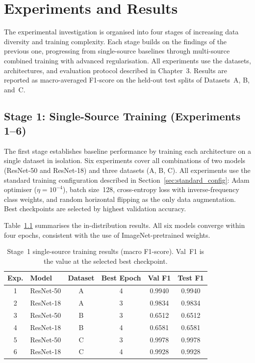 \chapter{Experiments and Results}
\label{ch:experiments}

The experimental investigation is organised into four stages of increasing data diversity
and training complexity. Each stage builds on the findings of the previous one, progressing
from single-source baselines through multi-source combined training with advanced
regularisation. All experiments use the datasets, architectures, and evaluation protocol
described in Chapter~3. Results are reported as macro-averaged F1-score on the held-out
test splits of Datasets~A, B, and~C.


\section{Stage 1: Single-Source Training (Experiments 1--6)}
\label{sec:stage1}

The first stage establishes baseline performance by training each architecture on a single
dataset in isolation. Six experiments cover all combinations of two models (ResNet-50 and
ResNet-18) and three datasets (A, B, C). All experiments use the standard training
configuration described in Section~\ref{sec:standard_config}: Adam optimiser
($\eta = 10^{-4}$), batch size~128, cross-entropy loss with inverse-frequency class
weights, and random horizontal flipping as the only data augmentation. Best checkpoints
are selected by highest validation accuracy.

Table~\ref{tab:stage1_results} summarises the in-distribution results. All six models
converge within four epochs, consistent with the use of ImageNet-pretrained weights.

\begin{table}[tb]
  \centering
  \caption{Stage~1 single-source training results (macro F1-score). Val~F1 is the value
           at the selected best checkpoint.}
  \label{tab:stage1_results}
  \begin{tabular}{clcccc}
    \hline
    \textbf{Exp.} & \textbf{Model} & \textbf{Dataset} & \textbf{Best Epoch} & \textbf{Val F1} & \textbf{Test F1} \\
    \hline
    1 & ResNet-50 & A & 4 & 0.9940 & 0.9940 \\
    2 & ResNet-18 & A & 3 & 0.9834 & 0.9834 \\
    3 & ResNet-50 & B & 3 & 0.6512 & 0.6512 \\
    4 & ResNet-18 & B & 4 & 0.6581 & 0.6581 \\
    5 & ResNet-50 & C & 3 & 0.9978 & 0.9978 \\
    6 & ResNet-18 & C & 4 & 0.9928 & 0.9928 \\
    \hline
  \end{tabular}
\end{table}

